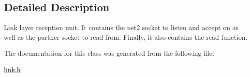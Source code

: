\subsection{Detailed Description}
Link layer reception unit. It contains the net2 socket to listen and accept on as well as the partner socket to read from. Finally, it also contains the read function. 

The documentation for this class was generated from the following file\-:\begin{DoxyCompactItemize}
\item 
\hyperlink{link_8h}{link.\-h}\end{DoxyCompactItemize}
